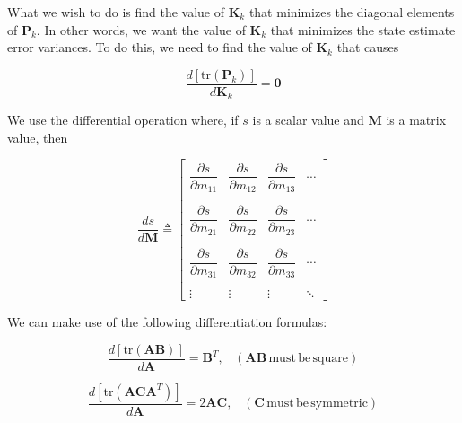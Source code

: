 What we wish to do is find the value of $\mathbf{K}_k$ that minimizes the diagonal
elements of $\mathbf{P}_k$. In other words, we want the value of $\mathbf{K}_k$ that
minimizes the state estimate error variances. To do this, we need to find the value of
$\mathbf{K}_k$ that causes

\begin{equation*}
    \frac {d \left[ \mathrm{tr} \left( \mathbf{P}_k \right) \right] } {d \mathbf{K}_k} = \mathbf{0}
\end{equation*}

We use the differential operation where, if $s$ is a scalar value and $\mathbf{M}$ is a
matrix value, then

\begin{equation*}
    \frac {d s} {d \mathbf{M}} \triangleq 
    \begin{bmatrix}
        \dfrac{\partial s}{\partial m_{11}} & \dfrac{\partial s}{\partial m_{12}} & \dfrac{\partial s}{\partial m_{13}} & \cdots \\
        \phantom{.} \\
        \dfrac{\partial s}{\partial m_{21}} & \dfrac{\partial s}{\partial m_{22}} & \dfrac{\partial s}{\partial m_{23}} & \cdots \\
        \phantom{.} \\
        \dfrac{\partial s}{\partial m_{31}} & \dfrac{\partial s}{\partial m_{32}} & \dfrac{\partial s}{\partial m_{33}} & \cdots \\
        \phantom{.} \\
        \vdots & \vdots & \vdots & \ddots
    \end{bmatrix}
\end{equation*}

We can make use of the following differentiation formulas:

\begin{equation*}
    \frac {d \left[ \mathrm{tr} \left( \mathbf{A} \mathbf{B} \right) \right] } {d \mathbf{A}} = \mathbf{B}^T , \phantom{X} (\mathbf{A} \mathbf{B} \, \mathrm{must} \, \mathrm{be} \, \mathrm{square})
\end{equation*}

\begin{equation*}
    \frac {d \left[ \mathrm{tr} \left( \mathbf{A} \mathbf{C} \mathbf{A}^T \right) \right]} {d \mathbf{A}} = 2 \mathbf{A} \mathbf{C} , \phantom{X} (\mathbf{C} \, \mathrm{must} \, \mathrm{be} \, \mathrm{symmetric})
\end{equation*}

